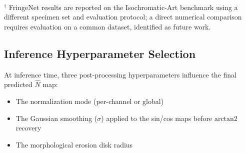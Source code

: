 \documentclass[review,12pt]{elsarticle}
\begin{document}
\begin{table}[H]
  \centering
  \caption{Comparison of fringe order demodulation methods. Calibration
    refers to a material-specific LUT or calibration specimen.}
  \label{tab:comparison}
  \footnotesize 
  \vspace{2pt}\\
  \footnotesize $^\dagger$ FringeNet results are reported on the
  Isochromatic-Art benchmark using a different specimen set and evaluation
  protocol; a direct numerical comparison requires evaluation on a common
  dataset, identified as future work.
\end{table}

\subsection{Inference Hyperparameter Selection}
\label{sec:hyperparameter_sweep}

At inference time, three post-processing hyperparameters influence the final predicted $\hat{N}$ map:

\begin{itemize}
\item The normalization mode (per-channel or global)
\item The Gaussian smoothing ($\sigma$) applied to the sin/cos maps before $\mathrm{arctan2}$ recovery
\item The morphological erosion disk radius
\end{itemize}
\end{document}
